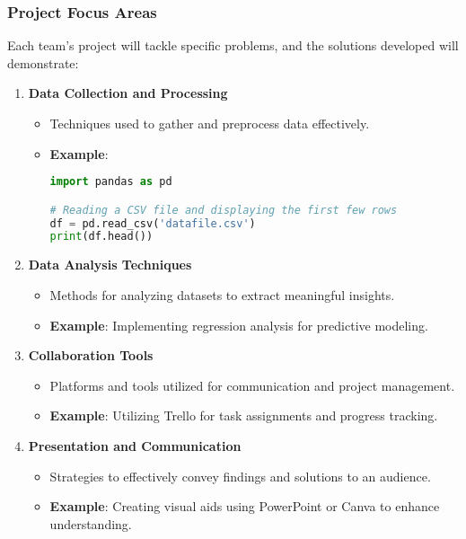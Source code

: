 \documentclass[aspectratio=169]{beamer}
\begin{document}
\begin{frame}[fragile]
    \frametitle{Project Focus Areas}

    Each team’s project will tackle specific problems, and the solutions developed will demonstrate:

    \begin{enumerate}
        \item \textbf{Data Collection and Processing}
            \begin{itemize}
                \item Techniques used to gather and preprocess data effectively. 
                \item \textbf{Example}: 
                    \begin{lstlisting}[language=Python]
import pandas as pd

# Reading a CSV file and displaying the first few rows
df = pd.read_csv('datafile.csv')
print(df.head())
                    \end{lstlisting}
            \end{itemize}
        
        \item \textbf{Data Analysis Techniques}
            \begin{itemize}
                \item Methods for analyzing datasets to extract meaningful insights.
                \item \textbf{Example}: Implementing regression analysis for predictive modeling.
            \end{itemize}
        
        \item \textbf{Collaboration Tools}
            \begin{itemize}
                \item Platforms and tools utilized for communication and project management.
                \item \textbf{Example}: Utilizing Trello for task assignments and progress tracking.
            \end{itemize}

        \item \textbf{Presentation and Communication}
            \begin{itemize}
                \item Strategies to effectively convey findings and solutions to an audience.
                \item \textbf{Example}: Creating visual aids using PowerPoint or Canva to enhance understanding.
            \end{itemize}
    \end{enumerate}
\end{frame}
\end{document}
